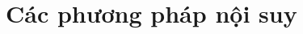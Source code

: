 \documentclass[../../Lectures]{subfiles}
\begin{document}
\chapter{Các phương pháp nội suy}
\end{document}
